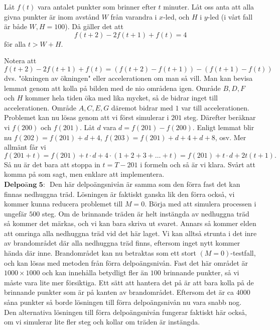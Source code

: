 \begin{lemma}
    Låt $f(t)$ vara antalet punkter som brinner efter $t$ minuter. Låt oss anta att alla givna punkter är inom avstånd $W$ från varandra i $x$-led, och $H$ i $y$-led (i vårt fall är både $W,H = 100$). Då gäller det att 
    $$f(t+2)-2f(t+1)+f(t) = 4$$
    för alla $t > W+H$.
\end{lemma}
Notera att 
$$f(t+2)-2f(t+1)+f(t) = (f(t+2)-f(t+1))-(f(t+1)-f(t))$$
dvs. "ökningen av ökningen" eller accelerationen om man så vill. Man kan bevisa lemmat genom att kolla på bilden med de nio områdena igen. Område $B,D,F$ och $H$ kommer hela tiden öka med lika mycket, så de bidrar inget till accelerationen. Område $A,C,E,G$ däremot bidrar med $1$ var till accelerationen. \\
Problemet kan nu lösas genom att vi först simulerar i $201$ steg. Därefter beräknar vi $f(200)$ och $f(201)$. Låt $d$ vara $d = f(201)-f(200)$. Enligt lemmat blir nu $f(202) = f(201) + d + 4$, $f(203) = f(201) + d + 4 + d + 8$, osv. Mer allmänt får vi 
$$f(201+t) = f(201) + t\cdot d + 4\cdot (1+2+3+\dots+t) = f(201) + t\cdot d + 2t(t+1).$$
Så nu är det bara att stoppa in $t = T-201$ i formeln och så är vi klara. Svårt att komma på som sagt, men enklare att implementera. \\

$\textbf{Delpoäng 5: }$ Den här delpoängsnivån är samma som den förra fast det kan finnas nedhuggna träd. Lösningen är faktiskt ganska lik den förra också, vi kommer kunna reducera problemet till $M = 0$. Börja med att simulera processen i ungefär $500$ steg. Om de brinnande träden är helt instängda av nedhuggna träd så kommer det märkas, och vi kan bara skriva ut svaret. Annars så kommer elden att omringa alla nedhuggna träd vid det här laget. Vi kan alltså strunta i det inre av brandområdet där alla nedhuggna träd finns, eftersom inget nytt kommer hända där inne. Brandområdet kan nu betraktas som ett stort $(M = 0)$-testfall, och kan lösas med metoden från förra delpoängsnivån. Fast det här området är $1000 \times 1000$ och kan innehålla betydligt fler än $100$ brinnande punkter, så vi måste vara lite mer försiktiga. Ett sätt att hantera det på är att bara kolla på de brinnande punkter som är på kanten av brandområdet. Eftersom det är ca $4000$ såna punkter så borde lösningen till förra delpoängsnivån nu vara snabb nog. \\ Den alternativa lösningen till förra delpoängsnivån fungerar faktiskt här också, om vi simulerar lite fler steg och kollar om träden är instängda. \\

